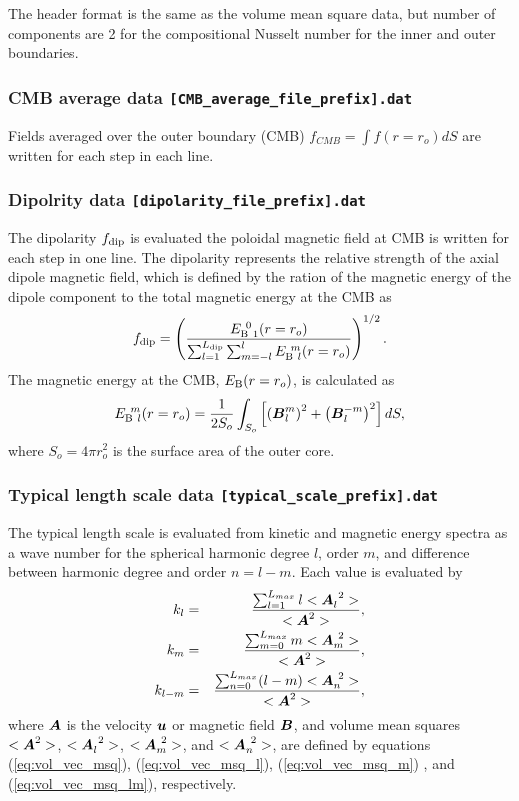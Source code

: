 The header format is the same as the volume mean square data, but number of components are 2 for the compositional Nusselt number for the inner and outer boundaries.

\subsubsection{CMB average data {\tt [CMB\_average\_file\_prefix].dat}}
Fields averaged over the outer boundary (CMB) $f_{CMB} = \int f(r=r_o) dS$ are written for each step in each line.

\subsubsection{Dipolrity data {\tt [dipolarity\_file\_prefix].dat}}
The dipolarity $f_{\rm dip}$ is evaluated the poloidal magnetic field at CMB is written for each step in one line. The dipolarity represents the relative strength of the axial dipole magnetic field, which is defined by the ration of the magnetic energy of the dipole component to the total magnetic energy at the CMB as
%
\begin{equation}
f_{\rm dip} = 
\left(
\frac{E_{{\rm B}\ 1}^{\ 0} (r=r_o)}
     {\sum_{l=1}^{L_{\rm dip}}
      \sum_{m=-l}^l E_{{\rm B}\ l}^{\ m} (r=r_o)}
\right)^{1/2}.
\label{eq:f_dip}
\end{equation}
%
The magnetic energy at the CMB, $E_{\rm B} (r=r_o)$, is calculated as
%
\begin{equation}
E_{{\rm B}\ l}^{\ m} (r=r_o) = 
  \frac{1}{2S_o} \int_{S_o} \left[
  \left(\mbox{\boldmath$B$}_{l}^{m} \right)^2 + \left(\mbox{\boldmath$B$}_{l}^{-m} \right)^2 \right] dS,
\end{equation}
%
where $S_o = 4\pi r_o^2$ is the surface area of the outer core.

\subsubsection{Typical length scale data {\tt [typical\_scale\_prefix].dat}}
The typical length scale is evaluated from kinetic and magnetic energy spectra as a wave number for the spherical harmonic degree $l$, order $m$, and difference between harmonic degree and order $n = l-m$. Each value is evaluated by
%
\begin{eqnarray}
k_{l} & = & \frac{\sum_{l=1}^{L_{max}} l <\mbox{\boldmath$A$}_{l}^{\ 2} >}{<\mbox{\boldmath$A$}^{2} >},
\\
k_{m} & = & \frac{\sum_{m=0}^{L_{max}} m <\mbox{\boldmath$A$}_{m}^{\ 2} >}{<\mbox{\boldmath$A$}^{2} >}, 
\\
k_{l-m} & = & \frac{\sum_{n=0}^{L_{max}} (l-m) <\mbox{\boldmath$A$}_{n}^{\ 2} >}{<\mbox{\boldmath$A$}^{2} >},
\end{eqnarray}
%
where $\mbox{\boldmath$A$}$ is the velocity $\mbox{\boldmath$u$}$ or magnetic field $\mbox{\boldmath$B$}$, and volume mean squares $<\mbox{\boldmath$A$}^{2}>$, $<\mbox{\boldmath$A$}_{l}^{\ 2}>$, $<\mbox{\boldmath$A$}_{m}^{\ 2}>$, and $<\mbox{\boldmath$A$}_{n}^{\ 2}>$, are defined by equations (\ref{eq:vol_vec_msq}), (\ref{eq:vol_vec_msq_l}), (\ref{eq:vol_vec_msq_m}) , and (\ref{eq:vol_vec_msq_lm}), respectively.

